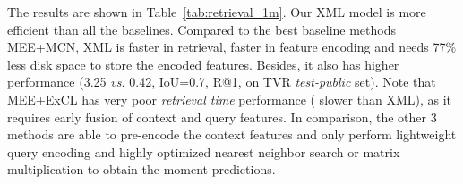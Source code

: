 \documentclass[runningheads]{llncs}
\newcommand{\ra}[1]{\renewcommand{\arraystretch}{#1}}
\begin{document}
\begin{table}[!t]
\setlength{\tabcolsep}{0.3em}
\ra{1.}
\centering
\small
\caption{VCMR on 1M videos with 100 queries. TVR \textit{test-public} set results are included as reference.Model references: \textit{MCN}~\cite{anne2017localizing},
\textit{CAL}~\cite{escorcia2019temporal}, \textit{MEE}~\cite{miech2018learning}, \textit{ExCL}~\cite{ghosh2019excl}}

\label{tab:retrieval_1m}
\end{table}



The results are shown in Table~\ref{tab:retrieval_1m}. Our XML model is more efficient than all the baselines. Compared to the best baseline methods MEE+MCN, XML is  faster in retrieval,  faster in feature encoding and needs 77\% less disk space to store the encoded features. Besides, it also has  higher performance (3.25 \textit{vs.} 0.42, IoU=0.7, R@1, on TVR \textit{test-public} set). Note that MEE+ExCL has very poor \textit{retrieval time} performance ( slower than XML), as it requires early fusion of context and query features. In comparison, the other 3 methods are able to pre-encode the context features and only perform lightweight query encoding and highly optimized nearest neighbor search or matrix multiplication to obtain the moment predictions.
\end{document}
